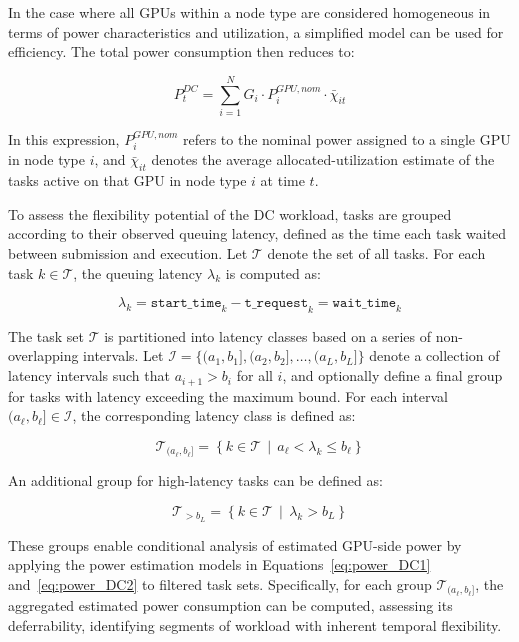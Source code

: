 \documentclass[preprint,12pt]{elsarticle}
\begin{document}
In the case where all GPUs within a node type are considered homogeneous in terms of power characteristics and utilization, a simplified model can be used for efficiency. The total power consumption then reduces to:

\begin{equation} \label{eq:power_DC2}
P^{DC}_t = \sum_{i=1}^{N} G_i \cdot P^{GPU, nom}_i \cdot \bar{\chi}_{it}
\end{equation}

In this expression, $P^{GPU, nom}_i$ refers to the nominal power assigned to a single GPU in node type $i$, and $\bar{\chi}_{it}$ denotes the average allocated-utilization estimate of the tasks active on that GPU in node type $i$ at time $t$.

To assess the flexibility potential of the DC workload, tasks are grouped according to their observed queuing latency, defined as the time each task waited between submission and execution. Let $\mathcal{T}$ denote the set of all tasks. For each task $k \in \mathcal{T}$, the queuing latency $\lambda_k$ is computed as:

\begin{equation}
\lambda_k = \texttt{start\_time}_k - \texttt{t\_request}_k = \texttt{wait\_time}_k
\end{equation}

The task set $\mathcal{T}$ is partitioned into latency classes based on a series of non-overlapping intervals. Let $\mathcal{I} = \{ (a_1, b_1], (a_2, b_2], \dots, (a_L, b_L] \}$ denote a collection of latency intervals such that $a_{i+1} > b_i$ for all $i$, and optionally define a final group for tasks with latency exceeding the maximum bound. For each interval $(a_\ell, b_\ell] \in \mathcal{I}$, the corresponding latency class is defined as:

\begin{equation}
\mathcal{T}_{(a_\ell, b_\ell]} = \left\{ k \in \mathcal{T} \,\middle|\, a_\ell < \lambda_k \leq b_\ell \right\}
\end{equation}

An additional group for high-latency tasks can be defined as:

\begin{equation}
\mathcal{T}_{>b_L} = \left\{ k \in \mathcal{T} \,\middle|\, \lambda_k > b_L \right\}
\end{equation}

These groups enable conditional analysis of estimated GPU-side power by applying the power estimation models in Equations~\ref{eq:power_DC1} and~\ref{eq:power_DC2} to filtered task sets. Specifically, for each group $\mathcal{T}_{(a_\ell, b_\ell]}$, the aggregated estimated power consumption can be computed, assessing its deferrability, identifying segments of workload with inherent temporal flexibility.
\end{document}
